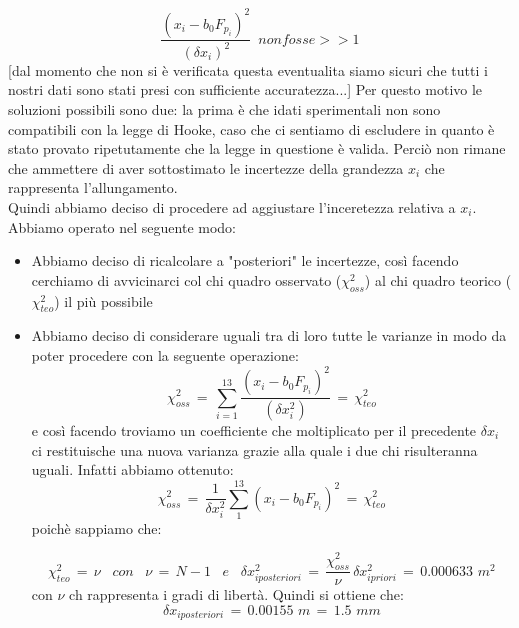 \begin{equation*}
	\frac{(x_i - b_0 F_{p_i})^2}{(\delta x_i)^2} \,\,\, non fosse >> 1
\end{equation*}
%
[dal momento che non si è verificata questa eventualita siamo sicuri che tutti i nostri dati sono stati presi con sufficiente accuratezza...]
Per questo motivo le soluzioni possibili sono due: la prima è che idati sperimentali non sono compatibili con la legge di Hooke, caso che ci sentiamo di escludere in quanto è stato provato ripetutamente che la legge in questione è valida. Perciò non rimane che ammettere di aver sottostimato le incertezze della grandezza $x_i$ che rappresenta l'allungamento.\\
Quindi abbiamo deciso di procedere ad aggiustare l'inceretezza relativa a $x_i$. Abbiamo operato nel seguente modo:
\begin{itemize}
\item{Abbiamo deciso di ricalcolare a "posteriori" le incertezze, così facendo cerchiamo di avvicinarci col chi quadro osservato ($\chi_{oss}^2$) al chi quadro teorico ($\chi_{teo}^2$) il più possibile}
\item{Abbiamo deciso di considerare uguali tra di loro tutte le varianze in modo da poter procedere con la seguente operazione:
	\begin{equation*}
		\chi_{oss}^2 \,=\, \sum_{i=1}^{13} \frac{(x_i - b_0 F_{p_i})^2}{(\delta x_i^2)} \,=\, \chi_{teo}^2 
	\end{equation*}
	e così facendo troviamo un coefficiente che moltiplicato per il precedente $\delta x_i$ ci restituische una nuova varianza grazie alla quale i due chi risulteranna uguali. Infatti abbiamo ottenuto:
	\begin{equation*}
		\chi_{oss}^2 \,=\, \frac{1}{\delta x_{i}^2} \sum_{1}^{13} (x_i - b_0 F_{p_i})^2  \,=\, \chi_{teo}^2
	\end{equation*}
	poichè sappiamo che:
	
	\begin{equation*}
		\chi_{teo}^2 \,=\, \nu \,\,\,\,\, con \,\,\,\,\,
		\nu \,=\, N - 1 \,\,\,\,\, e \,\,\,\,\,
		\delta x_{iposteriori}^2 \,=\, \frac{\chi_{oss}^2}{\nu} \, \delta x_{ipriori}^2 \,=\, 0.000633 \,\, m^2
	\end{equation*}
	con $\nu$ ch rappresenta i gradi di libertà.
	Quindi si ottiene che:
	\begin{equation*}
		\delta x_{iposteriori} \,=\, 0.00155 \,\, m \,=\, 1.5 \,\, mm
	\end{equation*}}	 
\end{itemize}
